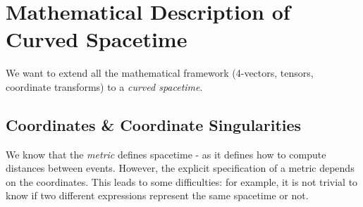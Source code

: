 \documentclass[../template.tex]{subfiles}
\begin{document}
\section{Mathematical Description of Curved Spacetime}
We want to extend all the mathematical framework (4-vectors, tensors, coordinate transforms) to a \textit{curved spacetime}.

\subsection{Coordinates \& Coordinate Singularities}
We know that the \textit{metric} defines spacetime - as it defines how to compute distances between events. However, the explicit specification of a metric depends on the coordinates. This leads to some difficulties: for example, it is not trivial to know if two different expressions represent the same spacetime or not.
\end{document}
